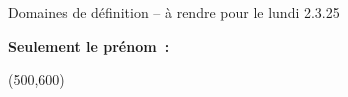 \documentclass[a4paper,12pt]{article}
\begin{document}
\begin{center}
	Domaines de définition -- à rendre pour le lundi 2.3.25
\begin{tcolorbox}
	{\bfseries Seulement le prénom~:}~\makebox[7.5cm]{\hrulefill}\end{tcolorbox}
\end{center}

\begin{center}
\framebox(500,600){}
\end{center}

\end{document}
